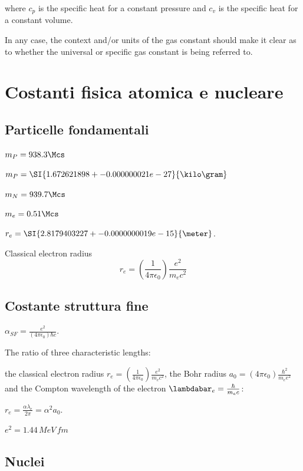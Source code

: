 where $c_p$ is the specific heat for a constant pressure and $c_v$ is the specific heat for a constant volume.

In any case, the context and/or units of the gas constant should make it clear as to whether the universal or specific gas constant is being referred to.
 
\chapter{Costanti fisica atomica e nucleare}
\PartialToc

\section{Particelle fondamentali}

\begin{itemize*}
\item $m_P=938.3\Mcs$
\item $m_P=\SI{1.672 621 898+-0.000 000 021e-27}{\kilo\gram}$
\item $m_N=939.7\Mcs$
\item $m_e=0.51\Mcs$
\item $r_e=\SI{2.817 940 3227+-0.000 000 0019e-15}{\meter}$.

\begin{definition}{Classical electron radius}
\begin{equation*}
r_e=(\frac{1}{4\pi\epsilon_0})\frac{e^2}{m_ec^2}
\end{equation*}
\end{definition}
\end{itemize*}



\section{Costante struttura fine}
 
 $\alpha_{SF}=\frac{e^2}{(4\pi\epsilon_0)\hbar c}$.

The ratio of three characteristic lengths:

the classical electron radius $r_e=(\frac{1}{4\pi\epsilon_0})\frac{e^2}{m_ec^2}$, the Bohr radius $a_0=(4\pi\epsilon_0)\frac{\hbar^2}{m_ee^2}$  and the Compton wavelength of the electron $\lambdabar_e=\frac{\hbar}{m_ec}$:

$r_e=\frac{\alpha\lambda_e}{2\pi}=\alpha^2a_0$.

$e^2=1.44\,MeV\,fm$


\section{Nuclei}

